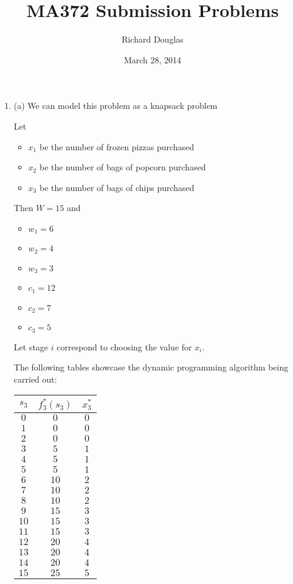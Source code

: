 \documentclass{article}[12pt,a4paper]
\title{MA372 Submission Problems}
\author{Richard Douglas}
\date{March 28,  2014}
\begin{document}
  \maketitle
  \begin{enumerate}
  \item
  (a) We can model this problem as a knapsack problem
  
  
  Let
  \begin{itemize}
  	\item $x_1$ be the number of frozen pizzas purchased
  	\item $x_2$ be the number of bags of popcorn purchased
  	\item $x_3$ be the number of bags of chips purchased
  \end{itemize}
  Then $W = 15$ and
  \begin{multicols}{2}
  \begin{itemize}
  	\item $w_1 = 6$
  	\item $w_2 = 4$
  	\item $w_3 = 3$
  \end{itemize}
  \columnbreak
  \begin{itemize}
  	\item $c_1 = 12$
  	\item $c_2 = 7$
  	\item $c_3 = 5$
  \end{itemize}
  \end{multicols}
  
  Let stage $i$ correspond to choosing the value for $x_i$.
  
  The following tables showcase the dynamic programming algorithm being carried out:
  
  \begin{multicols}{2}
  \begin{tabular}{c | c | c}
  $s_3$ & $f_3^*(s_3)$ & $x_3^*$ \\
  \hline
  $0$ & $0$ & $0$ \\
  $1$ & $0$ & $0$ \\
  $2$ & $0$ & $0$ \\
  $3$ & $5$ & $1$ \\
  $4$ & $5$ & $1$ \\
  $5$ & $5$ & $1$ \\
  $6$ & $10$ & $2$ \\
  $7$ & $10$ & $2$ \\
  $8$ & $10$ & $2$ \\
  $9$ & $15$ & $3$ \\
  $10$ & $15$ & $3$ \\
  $11$ & $15$ & $3$ \\
  $12$ & $20$ & $4$ \\
  $13$ & $20$ & $4$ \\
  $14$ & $20$ & $4$ \\
  $15$ & $25$ & $5$ \\
  \end{tabular}
  

\end{multicols}
\end{enumerate}
\end{document}
